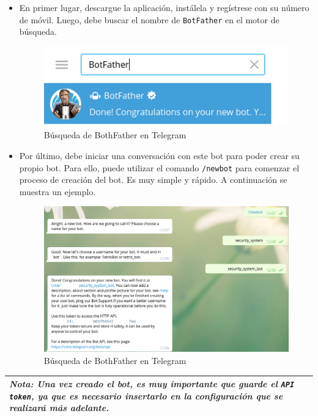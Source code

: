 \begin{itemize}

\item En primer lugar, descargue la aplicación, instálela y regístrese con su número de móvil. Luego, debe buscar el nombre de \texttt{BotFather} en el motor de búsqueda.

\begin{figure}[h]
	\centering
	\includegraphics[scale=0.6]{images/57}
	\caption{Búsqueda de BothFather en Telegram}
\end{figure}

\item Por último, debe iniciar una conversación con este bot para poder crear su propio bot. Para ello, puede utilizar el comando \texttt{/newbot} para comenzar el proceso de creación del bot. Es muy simple y rápido. A continuación se muestra un ejemplo.


\begin{figure}[h]
	\centering
	\includegraphics[scale=0.45]{images/58}
	\caption{Búsqueda de BothFather en Telegram}
\end{figure}

\end{itemize}

\begin{tabular}{|p{15.5cm}|}
	
	\hline
	
	\textit{\textbf{Nota:} Una vez creado el bot, es muy importante que guarde el \texttt{API token}, ya que es necesario insertarlo en la configuración que se realizará más adelante.}
	\\
	\hline
	
\end{tabular}

